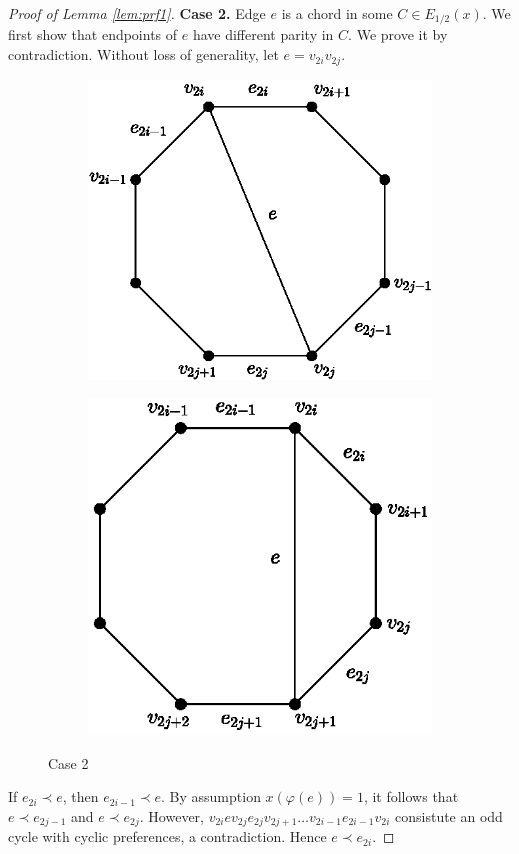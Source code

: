 \documentclass[11pt]{article}
\numberwithin{theorem}{section}
\begin{document}
\begin{proof}[Proof of Lemma \ref{lem:prf1}]
\textbf{Case 2.} Edge $e$ is a chord in some $C\in E_{1/2}(x)$. We first show that endpoints of $e$ have different parity in $C$. We prove it by contradiction. Without loss of generality, let $e=v_{2i}v_{2j}$.
\begin{figure}
\centering
\begin{subfigure}{.4\textwidth}
  \centering
  \includegraphics[width=.85\linewidth]{KernelMengerianO-fig1a}
  \caption{}
  \label{fig1a}
\end{subfigure}%
\begin{subfigure}{.4\textwidth}
  \centering
  \includegraphics[width=.845\linewidth]{KernelMengerianO-fig1b}
  \caption{}
  \label{fig1b}
\end{subfigure}
\caption{Case 2}
\end{figure}
If $e_{2i}\prec e$, then $e_{2i-1}\prec e$. By assumption $x(\varphi(e))=1$, it follows that $e\prec e_{2j-1}$ and $e\prec e_{2j}$. However, $v_{2i} e v_{2j} e_{2j} v_{2j+1} \ldots v_{2i-1} e_{2i-1} v_{2i}$ consistute an odd cycle with cyclic preferences, a contradiction. Hence $e\prec e_{2i}$.


\end{proof}
\end{document}
